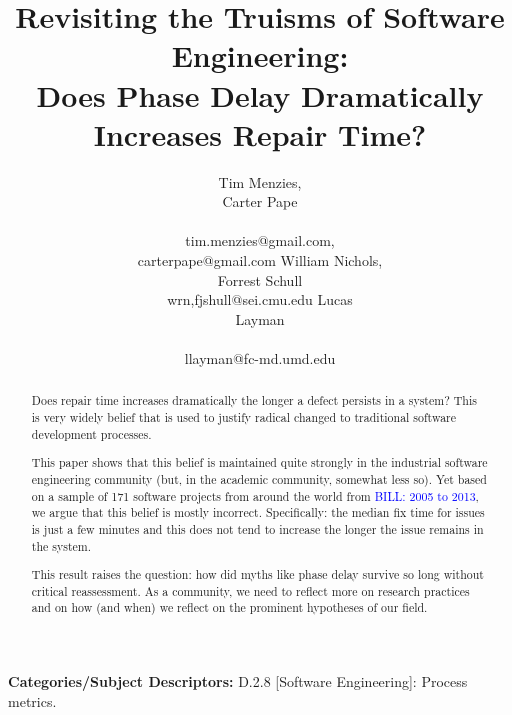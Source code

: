\documentclass{sig-alternate}
\newcommand{\bill}[1]{\textcolor{blue}{BILL: #1}}
\begin{document}
\title{Revisiting the Truisms of Software Engineering:\\ Does Phase Delay Dramatically Increases  Repair Time?}
\author{
\alignauthor
Tim Menzies, \\Carter Pape\\
       \\
       tim.menzies@gmail.com,\\carterpape@gmail.com
\alignauthor
William Nichols,\\ Forrest Schull\\
wrn,fjshull@sei.cmu.edu
\alignauthor
Lucas \\Layman\\
       \\ 
       llayman@fc-md.umd.edu
} 


 
\maketitle
\begin{abstract}
Does
repair time increases dramatically
the longer a defect persists in a system?
This  is very widely belief that is used to justify 
radical changed to    traditional software development
 processes.

This paper shows that this belief is maintained
quite strongly in the industrial software engineering
community (but, in the academic community, somewhat less so).
Yet based on a sample of 
171 software projects from around the world from 
\bill{2005 to 2013}, we argue that this belief is mostly 
incorrect. Specifically: the median fix time for issues
is just a few minutes and this does not tend to increase
the longer the issue remains in the system. 

This result raises the question:
how did myths like phase delay survive so long  without  critical reassessment.  
As a community, we need to reflect more on 
research practices and on how (and when) we reflect on the prominent hypotheses of our field.
\end{abstract}

\vspace{1mm}
\noindent
{\bf Categories/Subject Descriptors:} 
D.2.8 [Software Engineering]: Process metrics.

 
\end{document}
